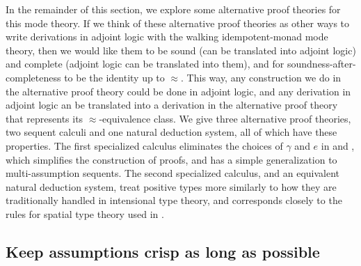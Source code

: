 \documentclass{drl-common/llncs}
\renewcommand\irl[1]{\dsd{#1}}
\newcommand\ap[2]{\ensuremath{#1 \approx #2}}
\begin{document}
In the remainder of this section, we explore some alternative proof
theories for this mode theory.  If we think of these alternative proof
theories as other ways to write derivations in adjoint logic with the
walking idempotent-monad mode theory, then we would like them to be sound (can
be translated into adjoint logic) and complete (adjoint logic can be
translated into them), and for soundness-after-completeness to be the
identity up to \ap{}{}.  This way, any construction we do in the
alternative proof theory could be done in adjoint logic, and any
derivation in adjoint logic an be translated into a derivation in the
alternative proof theory that represents its \ap{}{}-equivalence class.
We give three alternative proof theories, two sequent calculi and one
natural deduction system, all of which have these properties.  The first
specialized calculus eliminates the choices of $\gamma$ and $e$ in
\irl{FL} and \irl{UR}, which simplifies the construction of proofs, and
has a simple generalization to multi-assumption sequents.  The second
specialized calculus, and an equivalent natural deduction system, treat
positive types more similarly to how they are traditionally handled in
intensional type theory, and corresponds closely to the rules for spatial
type theory used in \citep{shulman15realcohesion}.

\subsection{Keep assumptions crisp as long as possible}
\label{sec:idempotent-calc1}
\end{document}

